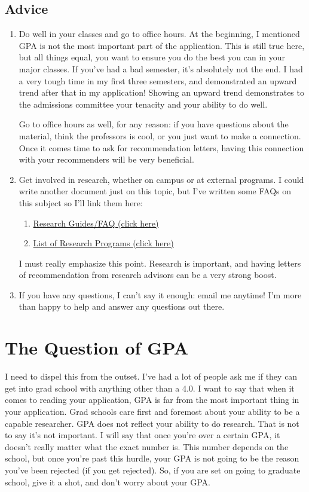 \documentclass[12pt]{article}
\begin{document}
\subsection{Advice}
\begin{enumerate}
\item Do well in your classes and go to office hours. At the beginning, I mentioned GPA is not the most important part of the application. This is still true here, but all things equal, you want to ensure you do the best you can in your major classes. If you've had a bad semester, it's absolutely not the end. I had a very tough time in my first three semesters, and demonstrated an upward trend after that in my application! Showing an upward trend demonstrates to the admissions committee your tenacity and your ability to do well.

Go to office hours as well, for any reason: if you have questions about the material, think the professors is cool, or you just want to make a connection. Once it comes time to ask for recommendation letters, having this connection with your recommenders will be very beneficial.

\item Get involved in research, whether on campus or at external programs. I could write another document just on this topic, but I've written some FAQs on this subject so I'll link them here:
\begin{enumerate}
\item \href{https://spsyale.sites.yale.edu/research-guidefaq}{Research Guides/FAQ (click here)}
\item \href{https://spsyale.sites.yale.edu/resources}{List of Research Programs (click here)}
\end{enumerate}
I must really emphasize this point. Research is important, and having letters of recommendation from research advisors can be a very strong boost.

\item If you have any questions, I can't say it enough: email me anytime! I'm more than happy to help and answer any questions out there.
\end{enumerate}

\section{The Question of GPA}
I need to dispel this from the outset. I've had a lot of people ask me if they can get into grad school with anything other than a 4.0. I want to say that when it comes to reading your application, GPA is far from the most important thing in your application. Grad schools care first and foremost about your ability to be a capable researcher. GPA does not reflect your ability to do research. That is not to say it's not important. I will say that once you're over a certain GPA, it doesn't really matter what the exact number is. This number depends on the school, but once you're past this hurdle, your GPA is not going to be the reason you've been rejected (if you get rejected). So, if you are set on going to graduate school, give it a shot, and don't worry about your GPA.
\end{document}

